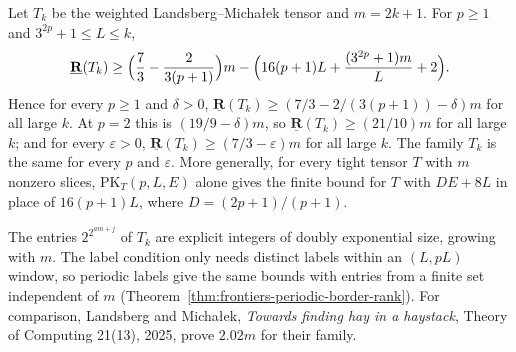 \begin{theorem}
  \label{thm:frontiers-explicit-border-rank}
  \leanok
  Let $T_k$ be the weighted Landsberg--Micha{\l}ek tensor and $m = 2k + 1$. For $p \ge 1$
  and $3^{2p} + 1 \le L \le k$,
  \[
    \underline{\mathbf{R}}(T_k) \ge \Bigl(\frac{7}{3} - \frac{2}{3(p + 1)}\Bigr) m
      - \Bigl(16(p + 1)L + \frac{(3^{2p} + 1)m}{L} + 2\Bigr).
  \]
  Hence for every $p \ge 1$ and $\delta > 0$,
  $\underline{\mathbf{R}}(T_k) \ge (7/3 - 2/(3(p + 1)) - \delta)m$ for all large $k$. At
  $p = 2$ this is $(19/9 - \delta)m$, so $\underline{\mathbf{R}}(T_k) \ge (21/10)m$ for all
  large $k$; and for every $\varepsilon > 0$,
  $\underline{\mathbf{R}}(T_k) \ge (7/3 - \varepsilon)m$ for all large $k$. The family $T_k$
  is the same for every $p$ and $\varepsilon$. More generally, for every tight tensor $T$
  with $m$ nonzero slices, $\mathrm{PK}_T(p, L, E)$ alone gives the finite bound for $T$ with
  $DE + 8L$ in place of $16(p + 1)L$, where $D = (2p + 1)/(p + 1)$.

  The entries $2^{2^{am + j}}$ of $T_k$ are explicit integers of doubly exponential size,
  growing with $m$. The label condition only needs distinct labels within an $(L, pL)$
  window, so periodic labels give the same bounds with entries from a finite set independent
  of $m$ (Theorem~\ref{thm:frontiers-periodic-border-rank}). For comparison, Landsberg and
  Micha{\l}ek, \emph{Towards finding hay in a haystack}, Theory of Computing 21(13), 2025,
  prove $2.02m$ for their family.
\end{theorem}

